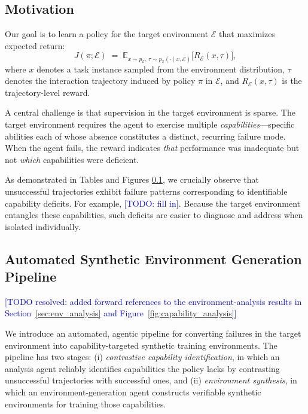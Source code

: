 \subsection{Motivation}

Our goal is to learn a policy for the target environment $\mathcal{E}$ that maximizes expected return:
\[
J(\pi;\mathcal{E})
\;=\;
\mathbb{E}_{x \sim p_{\mathcal{E}},\, \tau \sim p_{\pi}(\cdot \mid x,\mathcal{E})}
\bigl[ R_{\mathcal{E}}(x,\tau) \bigr],
\]
where $x$ denotes a task instance sampled from the environment distribution, $\tau$ denotes the interaction trajectory induced by policy $\pi$ in $\mathcal{E}$, and $R_{\mathcal{E}}(x,\tau)$ is the trajectory-level reward.

A central challenge is that supervision in the target environment is sparse. The target environment requires the agent to exercise multiple \emph{capabilities}---specific abilities each of whose absence constitutes a distinct, recurring failure mode. When the agent fails, the reward indicates \emph{that} performance was inadequate but not \emph{which} capabilities were deficient. 

As demonstrated in Tables and Figures \ref{}, we crucially observe that unsuccessful trajectories exhibit failure patterns corresponding to identifiable capability deficits. For example, \textcolor{blue}{[TODO: fill in]}. Because the target environment entangles these capabilities, such deficits are easier to diagnose and address when isolated individually.

\subsection{Automated Synthetic Environment Generation Pipeline}
\label{sec:env_gen}

\textcolor{blue}{[TODO resolved: added forward references to the environment-analysis results in Section~\ref{sec:env_analysis} and Figure~\ref{fig:capability_analysis}]}

We introduce an automated, agentic pipeline for converting failures in the target environment into capability-targeted synthetic training environments. The pipeline has two stages: (i) \emph{contrastive capability identification}, in which an analysis agent reliably identifies capabilities the policy lacks by contrasting unsuccessful trajectories with successful ones, and (ii) \emph{environment synthesis}, in which an environment-generation agent constructs verifiable synthetic environments for training those capabilities.

